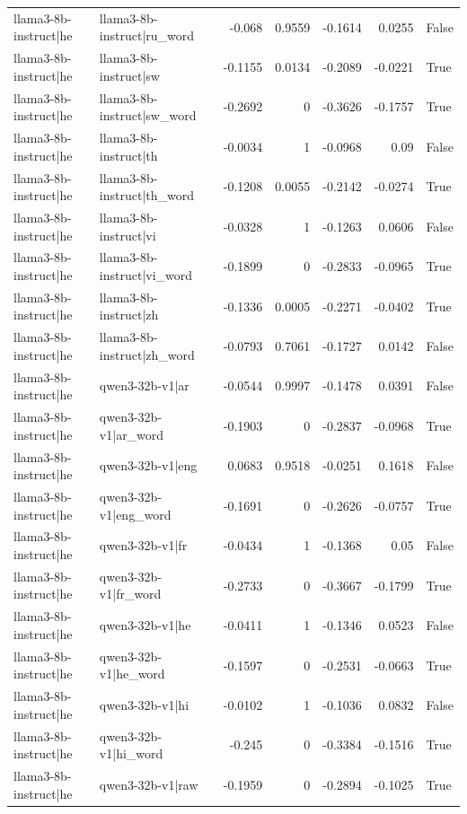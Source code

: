 \begin{table}
\begin{tabular}{l l r r r r l}
llama3-8b-instruct|he & llama3-8b-instruct|ru_word & -0.068 & 0.9559 & -0.1614 & 0.0255 & False \\
llama3-8b-instruct|he & llama3-8b-instruct|sw & -0.1155 & 0.0134 & -0.2089 & -0.0221 & True \\
llama3-8b-instruct|he & llama3-8b-instruct|sw_word & -0.2692 & 0 & -0.3626 & -0.1757 & True \\
llama3-8b-instruct|he & llama3-8b-instruct|th & -0.0034 & 1 & -0.0968 & 0.09 & False \\
llama3-8b-instruct|he & llama3-8b-instruct|th_word & -0.1208 & 0.0055 & -0.2142 & -0.0274 & True \\
llama3-8b-instruct|he & llama3-8b-instruct|vi & -0.0328 & 1 & -0.1263 & 0.0606 & False \\
llama3-8b-instruct|he & llama3-8b-instruct|vi_word & -0.1899 & 0 & -0.2833 & -0.0965 & True \\
llama3-8b-instruct|he & llama3-8b-instruct|zh & -0.1336 & 0.0005 & -0.2271 & -0.0402 & True \\
llama3-8b-instruct|he & llama3-8b-instruct|zh_word & -0.0793 & 0.7061 & -0.1727 & 0.0142 & False \\
llama3-8b-instruct|he & qwen3-32b-v1|ar & -0.0544 & 0.9997 & -0.1478 & 0.0391 & False \\
llama3-8b-instruct|he & qwen3-32b-v1|ar_word & -0.1903 & 0 & -0.2837 & -0.0968 & True \\
llama3-8b-instruct|he & qwen3-32b-v1|eng & 0.0683 & 0.9518 & -0.0251 & 0.1618 & False \\
llama3-8b-instruct|he & qwen3-32b-v1|eng_word & -0.1691 & 0 & -0.2626 & -0.0757 & True \\
llama3-8b-instruct|he & qwen3-32b-v1|fr & -0.0434 & 1 & -0.1368 & 0.05 & False \\
llama3-8b-instruct|he & qwen3-32b-v1|fr_word & -0.2733 & 0 & -0.3667 & -0.1799 & True \\
llama3-8b-instruct|he & qwen3-32b-v1|he & -0.0411 & 1 & -0.1346 & 0.0523 & False \\
llama3-8b-instruct|he & qwen3-32b-v1|he_word & -0.1597 & 0 & -0.2531 & -0.0663 & True \\
llama3-8b-instruct|he & qwen3-32b-v1|hi & -0.0102 & 1 & -0.1036 & 0.0832 & False \\
llama3-8b-instruct|he & qwen3-32b-v1|hi_word & -0.245 & 0 & -0.3384 & -0.1516 & True \\
llama3-8b-instruct|he & qwen3-32b-v1|raw & -0.1959 & 0 & -0.2894 & -0.1025 & True \\

\end{tabular}
\end{table}
